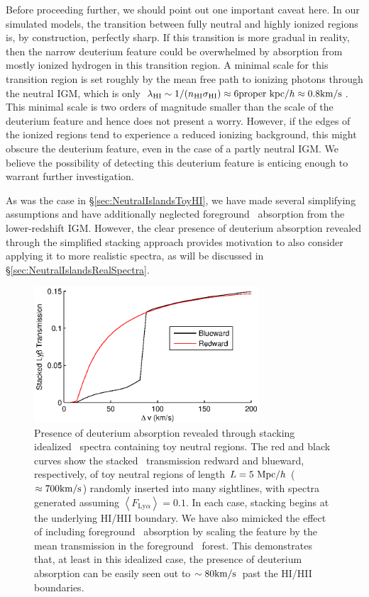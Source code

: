 Before proceeding further, we should point out one important caveat here. In our simulated models, the transition between fully neutral and highly ionized regions is, by construction, perfectly sharp. If this
transition is more gradual in reality, then the narrow deuterium feature could be overwhelmed by absorption from mostly ionized hydrogen in this transition region. A minimal scale for this transition
region is set roughly by the mean free path to ionizing photons through the neutral IGM, which is only $\lambda_{\text{HI}} \sim 1/(n_{\text{HI}} \sigma_{\text{HI}}) \approx 6 \text{proper kpc}/h \approx 0.8 \text{km}/\text{s}$.
This minimal scale is two orders of magnitude smaller than the scale of the deuterium feature and hence does not present a worry. However, if the edges of the ionized regions tend to experience
a reduced ionizing background, this might obscure the deuterium feature, even in the case of a partly neutral IGM. We believe the possibility of detecting this deuterium feature is enticing enough to
warrant further investigation.


As was the case in \S \ref{sec:NeutralIslandsToyHI}, we have made several simplifying assumptions and have additionally neglected foreground \lya\ absorption from the lower-redshift IGM. However, the clear presence of deuterium absorption revealed through the simplified stacking approach provides motivation to also consider applying it to more realistic spectra, as will be discussed in \S \ref{sec:NeutralIslandsRealSpectra}.


\begin{figure}[!ht]
  \centering
  \includegraphics[width=8.4cm]{fig5.eps}
  \caption{Presence of deuterium absorption revealed through stacking idealized \lyb\ spectra containing toy neutral regions. The red and black curves show the stacked \lyb\ transmission redward and blueward, respectively, of toy neutral regions of length $L = 5\ \text{Mpc/$h$}$ ($\approx 700\text{km}/\text{s}$) randomly inserted into many sightlines, with spectra generated assuming $\left\langle F_{\text{Ly}\alpha} \right\rangle = 0.1$. In each case, stacking begins at the underlying HI/HII boundary. We have also mimicked the effect of including foreground \lya\ absorption by scaling the feature by the mean transmission in the foreground \lya\ forest. This demonstrates that, at least in this idealized case, the presence of deuterium absorption can be easily seen out to $\sim80\text{km}/\text{s}$\ past the HI/HII boundaries.}
  \label{fig:ToyD}
\end{figure}




